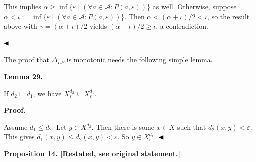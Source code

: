 \documentclass[10pt,a4paper]{article}
\begin{document}
This implies $\alpha\geq\inf\{\varepsilon\mid(\forall a\in\mathcal{A}:P(a,\varepsilon))\}$ as well. Otherwise, suppose $\alpha<\iota:=\inf\{\varepsilon\mid(\forall a\in\mathcal{A}:P(a,\varepsilon))\}$. Then $\alpha<(\alpha+\iota)/2<\iota$, so the result above with $\gamma=(\alpha+\iota)/2$ yields $(\alpha+\iota)/2\geq\iota$, a contradiction.\par
 
   
$\hfill\blacktriangleleft$\par
 
 
 
The proof that $\Delta_{LP}$ is monotonic needs the following simple lemma.\par
 
 
 
\par\medskip\noindent\textbf{Lemma 29.}\par
 
 
If $d_{2}\sqsubseteq d_{1}$, we have $X^{d_{2}}_{\varepsilon}\subseteq X^{d_{1}}_{\varepsilon}$.\par
 
 
 


 
\par\medskip\noindent\textbf{Proof.}\par
 
 
Assume $d_{1}\leq d_{2}$. Let $y\in X^{d_{2}}_{\varepsilon}$. Then there is some $x\in X$ such that $d_{2}(x,y)<\varepsilon$. This gives $d_{1}(x,y)\leq d_{2}(x,y)<\varepsilon$. So $y\in X^{d_{1}}_{\varepsilon}$. $\hfill\blacktriangleleft$\par
 
 
 
 
\par\medskip\noindent\textbf{Proposition 14. [Restated, see original statement.]}\par
 
\end{document}

